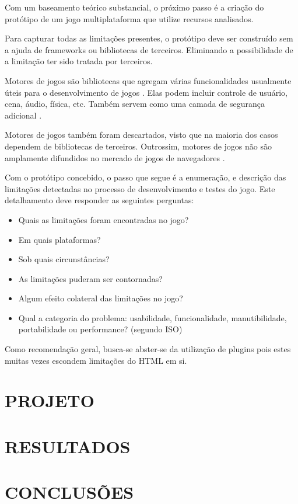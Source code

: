 \documentclass[
12pt,
a4paper,
portuges,
draft
]{report}
\begin{document}
Com um baseamento teórico substancial, o próximo passo é a criação
do protótipo de um jogo multiplataforma que utilize recursos
analisados.

Para capturar todas as limitações presentes, o protótipo deve ser
construído sem a ajuda de frameworks ou bibliotecas de terceiros.
Eliminando a possibilidade de a limitação ter sido tratada por
terceiros.

Motores de jogos são bibliotecas que agregam várias funcionalidades
usualmente úteis para o desenvolvimento de jogos \autocite[pp.
5]{browserGamesTechnologyAndFuture}. Elas podem incluir controle
de usuário, cena, áudio, física, etc. Também servem como uma camada de 
segurança adicional \autocite{browserGamesTechnologyAndFuture}.

Motores de jogos também foram descartados, visto que
na maioria dos casos dependem de bibliotecas de terceiros. Outrossim,
motores de jogos não são amplamente difundidos no mercado de jogos de
navegadores \autocite{browserGamesTechnologyAndFuture}.

Com o protótipo concebido, o passo que segue é a enumeração, e
descrição das limitações detectadas no processo de desenvolvimento e
testes do jogo. Este detalhamento deve responder as seguintes perguntas:

\begin{itemize}
\item Quais as limitações foram encontradas no jogo?
\item Em quais plataformas?
\item Sob quais circunstâncias?
\item As limitações puderam ser contornadas?
\item Algum efeito colateral das limitações no jogo?
\item Qual a categoria do problema: usabilidade, funcionalidade, manutibilidade, portabilidade ou performance? (segundo ISO)
\end{itemize}

Como recomendação geral, busca-se abster-se da utilização de plugins
pois estes muitas vezes escondem limitações do HTML em si.

\chapter{PROJETO}
\thispagestyle{myheadings}

\chapter{RESULTADOS}
\thispagestyle{myheadings}

\chapter{CONCLUSÕES}
\thispagestyle{myheadings}


\clearpage
\markboth{}{}
\printbibliography[heading=bibintoc,title={REFERÊNCIAS BIBLIOGRÁFICAS}]
\markboth{}{}
\appendix

\end{document}
